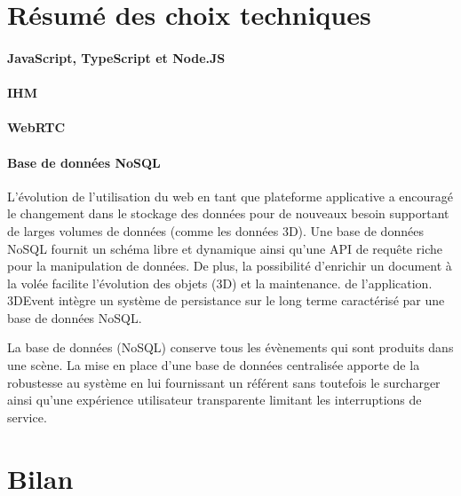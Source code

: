 


\section{Résumé des choix techniques}

\paragraph{JavaScript, TypeScript et Node.JS}
\paragraph{IHM}
\paragraph{WebRTC}
\paragraph{Base de données NoSQL}\label{p:nosql} L'évolution de 
l'utilisation du web en tant que plateforme applicative a encouragé le changement 
dans le stockage des données pour de nouveaux besoin supportant de larges 
volumes de données (comme les données 3D). Une base de données \gls{NoSQL} 
fournit un schéma libre et dynamique ainsi qu'une API de requête riche pour la 
manipulation de données. De plus, la possibilité d'enrichir un document à la volée 
facilite l'évolution des objets (3D) et la maintenance. de l'application.
3DEvent intègre un système de persistance sur le long terme caractérisé par une 
base de données \gls{NoSQL}.

La base de données (\gls{NoSQL}) conserve tous les évènements qui 
sont produits dans une scène. 
La mise en place d'une base de données centralisée apporte de la robustesse au 
système en lui fournissant un référent sans toutefois le surcharger ainsi qu'une 
expérience utilisateur transparente limitant les interruptions de service.
\section{Bilan}


